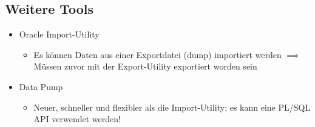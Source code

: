 \subsection{Weitere Tools}
\begin{itemize}
    \item Oracle Import-Utility
    \begin{itemize}
        \item Es können Daten aus einer Exportdatei (dump) importiert werden $\implies$ Müssen zuvor mit der Export-Utility exportiert worden sein
    \end{itemize}
    \item Data Pump
    \begin{itemize}
        \item Neuer, schneller und flexibler als die Import-Utility; es kann eine PL/SQL API verwendet werden!
    \end{itemize}
\end{itemize}